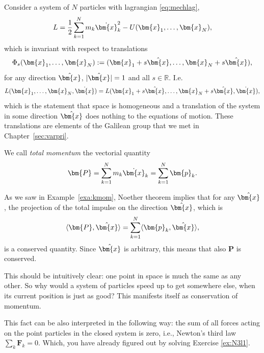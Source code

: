 \documentclass[english,fontsize=11pt,paper=a5,oneside]{scrbook}
\newcommand{\R}{\mathbb{R}}
\newcommand{\bx}{\bm{x}}
\newcommand{\lag}{\langle}
\newcommand{\rag}{\rangle}
\theoremstyle{definition}
\begin{document}
Consider a system of $N$ particles with lagrangian \eqref{eq:mechlag},
\begin{equation}
  L = \frac12 \sum_{k=1}^N m_k \dot \bx_k^2 - U(\bx_1, \ldots, \bx_N),
\end{equation}
which is invariant with respect to translations
\begin{equation}
  \Phi_s(\bx_1, \ldots, \bx_N) := (\bx_1 + s \hat \bx,\ldots, \bx_N + s \hat \bx),
\end{equation}
for any direction $\hat\bx$, $|\hat\bx|=1$ and all $s\in\R$. I.e.
\begin{equation}
  L(\bx_1, \ldots, \bx_N, \dot \bx) = L(\bx_1 + s \hat\bx, \ldots, \bx_N + s \hat\bx, \dot \bx),
\end{equation}
which is the statement that space is homogeneous and a translation of the system in some direction $\hat\bx$ does nothing to the equations of motion. These translations are elements of the Galilean group that we met in Chapter~\ref{sec:varpri}.

We call \emph{total momentum} the vectorial quantity
\begin{equation}
  \bm{P} = \sum_{k=1}^N m_k \dot \bx_k = \sum_{k=1}^N \bm{p}_k.
\end{equation}

As we saw in Example~\ref{exa:kmom}, Noether theorem implies that for any $\hat\bx$, the projection of the total impulse on the direction $\hat\bx$, which is
\begin{equation}
  \lag\bm{P}, \hat\bx\rag = \sum_{k=1}^N \lag \bm{p}_k, \hat\bx\rag,
\end{equation}
is a conserved quantity.
Since $\hat\bx$ is arbitrary, this means that also $\bm{P}$ is conserved.

This should be intuitively clear: one point in space is much the same as any other. So why would a system of particles speed up to get somewhere else, when its current position is just as good? This manifests itself as conservation of momentum.

This fact can be also interpreted in the following way: the sum of all forces acting on the point particles in the closed system is zero, i.e., Newton's third law $\sum_k \bm{F}_k = 0$. Which, you have already figured out by solving Exercise \ref{ex:N3l1}.
\end{document}
